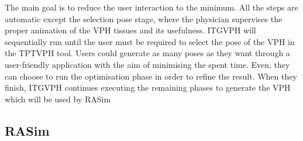 The main goal is to reduce the user interaction to the minimum. %
All the steps are automatic except the selection pose stage, where the physician supervises the proper animation of the VPH tissues and its usefulness. \acs{ITGVPH} will sequentially run until the user must be required to select the pose of the VPH in the \acs{TPTVPH} tool. Users could generate as many poses as they want through a user-friendly application with the aim of minimising the spent time. Even, they can choose to run the optimisation phase in order to refine the result. When they finish, \acs{ITGVPH} continues executing the remaining phases to generate the VPH which will be used by \acs{RASim}




\subsection{RASim}
\label{conclu:rasim}


